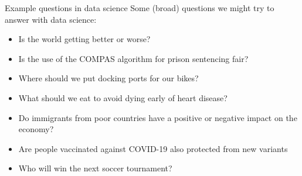 \documentclass[aspectratio=169]{../latex_main/tntbeamer}  %
\begin{document}
    
    \begin{frame}[c]{Example questions in data science}
        Some (broad) questions we might try to answer with data science:
        \begin{itemize}
            \item Is the world getting better or worse?
            \item Is the use of the COMPAS algorithm for prison sentencing fair?
            \item Where should we put docking ports for our bikes?
            \item What should we eat to avoid dying early of heart disease?
            \item Do immigrants from poor countries have a positive or negative impact on the economy?
            \item Are people vaccinated against COVID-19 also protected from new variants
            \item Who will win the next soccer tournament?
        \end{itemize}
    \end{frame}
    
\end{document}

